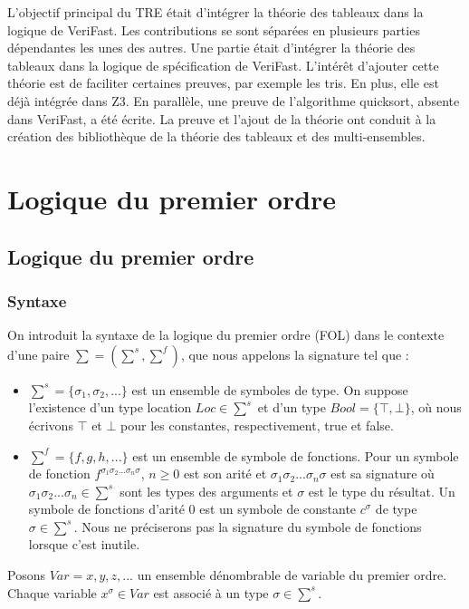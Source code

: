 \documentclass[9pt]{book}
\newcommand{\verifast}{VeriFast}
\begin{document}
	L'objectif principal du TRE \'etait d'int\'egrer la th\'eorie des tableaux dans la logique de \verifast{}. Les contributions se sont s\'epar\'ees en plusieurs parties d\'ependantes les unes des autres. Une partie \'etait d'int\'egrer la th\'eorie des tableaux dans la logique de sp\'ecification de \verifast. L'int\'er\^et d'ajouter cette th\'eorie est de faciliter certaines preuves, par exemple les tris. En plus, elle est d\'ej\`a int\'egr\'ee dans Z3. En parall\`ele, une preuve de l'algorithme quicksort, absente dans \verifast, a \'et\'e \'ecrite. La preuve et l'ajout de la th\'eorie ont conduit \`a la cr\'eation des biblioth\`eque de la th\'eorie des tableaux et des multi-ensembles.



\chapter{Logique du premier ordre}
	\section{Logique du premier ordre}
		\subsection{Syntaxe}
		On introduit la syntaxe de la logique du premier ordre (FOL) dans le contexte d'une paire $\sum = (\sum^s,\sum^f)$, que nous appelons la signature tel que :
		\begin{itemize}
		\item $\sum^s = \{ \sigma_{1}, \sigma_{2},...\}$ est un ensemble de symboles de type. On suppose l'existence d'un type location $Loc \in \sum^{s}$ et d'un type $Bool = \{ \top , \bot \}$, o\`u nous \'ecrivons $\top$ et $\bot$ pour les constantes, respectivement, true et false.
		\item $\sum^f = \{ f, g, h,...\}$ est un ensemble de symbole de fonctions. Pour un symbole de fonction $f^{\sigma_{1}\sigma_{2}... \sigma_{n}\sigma}$, $n \geq 0$ est son arit\'e et $\sigma_{1}\sigma_{2}... \sigma_{n}\sigma$ est sa signature o\`u $\sigma_{1}\sigma_{2}... \sigma_{n} \in \sum^{s}$ sont les types des arguments et $\sigma$ est le type du r\'esultat. Un symbole de fonctions d'arit\'e 0 est un symbole de constante $c^{\sigma}$ de type $\sigma \in \sum^{s}$. Nous ne pr\'eciserons pas la signature du symbole de fonctions lorsque c'est inutile.
		\end{itemize}

	   Posons $Var = {x,y,z,...}$ un ensemble d\'enombrable de variable du premier ordre. Chaque variable $x^{\sigma} \in Var$ est associ\'e \`a un type $\sigma \in \sum^{s}$.
	   
\end{document}
